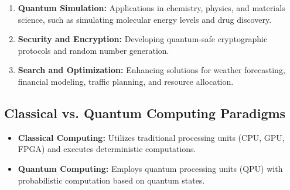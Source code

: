 \begin{enumerate}
  \item \textbf{Quantum Simulation:} Applications in chemistry, physics,
    and materials science, such as simulating molecular energy levels and
    drug discovery.

  \item \textbf{Security and Encryption:} Developing quantum-safe
    cryptographic protocols and random number generation.

  \item \textbf{Search and Optimization:} Enhancing solutions for weather
    forecasting, financial modeling, traffic planning, and resource
    allocation.

\end{enumerate}


\subsection*{Classical vs. Quantum Computing Paradigms}
\begin{itemize}

  \item \textbf{Classical Computing:} Utilizes
    traditional processing units (CPU, GPU, FPGA) and executes deterministic
    computations.

  \item \textbf{Quantum Computing:} Employs quantum processing units (QPU)
    with probabilistic computation based on quantum states.

\end{itemize}


